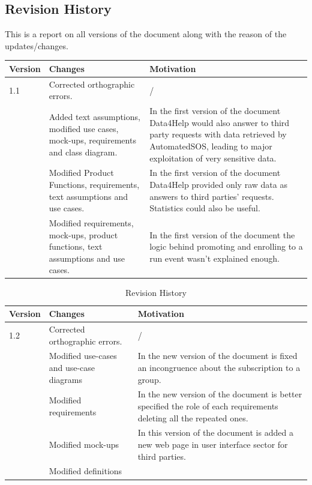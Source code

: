 \newpage
\subsection{Revision History}
This is a report on all versions of the document along with the reason of the updates/changes.

\begin{table}[h]
\begin{tabular}{|l|p{}|p{}|}
\hline
Version & Changes & Motivation\\ \hline
1.1     & Corrected orthographic errors. & / \\ \hline
 & Added text assumptions, modified use cases, mock-ups, requirements and class diagram. & In the first version of the document Data4Help would also answer to third party requests with data retrieved by AutomatedSOS, leading to major exploitation of very sensitive data.   \\ \hline
 & Modified Product Functions, requirements, text assumptions and use cases. & In the first version of the document Data4Help provided only raw data as answers to third parties' requests. Statistics could also be useful.  \\ \hline
 & Modified requirements, mock-ups, product functions, text assumptions and use cases. & In the first version of the document the logic behind promoting and enrolling to a run event wasn't explained enough. \\ \hline
\end{tabular}
\end{table}

\begin{table}[h]
\begin{tabular}{|l|p{}|p{}|}
\hline
Version & Changes & Motivation\\ \hline
1.2     & Corrected orthographic errors. & /  \\ \hline
& Modified use-cases and use-case diagrams & In the new version of the document is fixed an incongruence about the subscription to a group.  \\ \hline
 & Modified requirements & In the new version of the document is better specified the role of each requirements deleting all the repeated ones.   \\ \hline
 & Modified mock-ups & In this version of the document is added a new web page in user interface sector for third parties. \\ \hline
  & Modified definitions & \ \\ \hline
\end{tabular}
\caption{Revision History}
\end{table}

